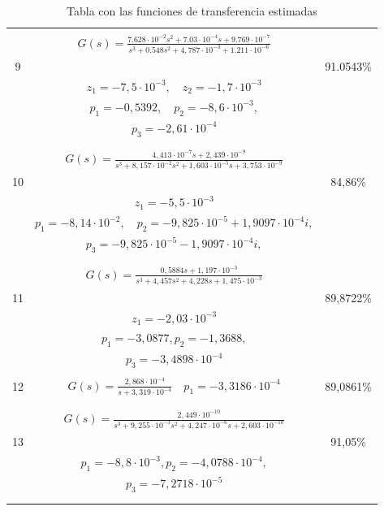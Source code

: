 \begin{longtable}{| c | c | c |}
\hline
     &  &   \\
     &  \large$ G(s) = \frac{7.628 \cdot 10^{-2}s^{2}+ 7.03 \cdot 10^{-4}s + 9.769 \cdot 10^{-7}}{ s^{3} + 0.548s^{2} + 4,787\cdot 10^{-3} + 1.211 \cdot 10^{-6}} $  \\
  9 &  & 91.0543\%  \\
     &  $ z_{1} = -7,5 \cdot 10^{-3},\quad z_{2} = -1,7 \cdot 10^{-3} $ &   \\
     &  $ p_{1} = -0,5392,\quad p_{2} = -8,6 \cdot 10^{-3}, $ & \\
     &  $ p_{3}= -2,61 \cdot 10^{-4} $ &  \\
     &  &   \\
\hline
     &  &   \\
     &  \large$ G(s) = \frac{4,413 \cdot 10^{-7}s + 2,439 \cdot 10^{-9}}{ s^{3} + 8,157 \cdot 10^{-2}s^{2} + 1,603\cdot 10^{-5}s + 3,753 \cdot 10^{-9}} $ &  \\
10 &  & 84,86\%  \\
     &  $ z_{1} = -5,5 \cdot 10^{-3}$ &   \\
     &  $ p_{1} = -8,14 \cdot 10^{-2},\quad p_{2} =-9,825 \cdot 10 ^{-5} + 1,9097 \cdot 10^{-4}i,$ &  \\
     &  $ p_{3} = -9,825 \cdot 10 ^{-5} - 1,9097 \cdot 10^{-4}i, $  &   \\
     &  &  \\
\hline
     &  &   \\
     &  \large$ G(s) = \frac{0,5884s + 1,197 \cdot 10^{-3}}{ s^{3} + 4,457s^{2} + 4,228 s + 1,475 \cdot 10^{-3}} $ &  \\
11 &  & 89,8722\% \\
     &  $ z_{1} = -2,03 \cdot 10^{-3}$ &   \\
     &  $ p_{1} =-3,0877,   p_{2} = -1,3688, $ & \\
     &  $ p_{3} = -3,4898 \cdot 10^{-4} $ &  \\
\hline
     &  &   \\
 12 &  \large$ G(s) = \frac{2,868 \cdot 10^{-4}}{ s + 3,319 \cdot 10^{-4}} \quad p_{1} = -3,3186 \cdot 10^{-4} $ &  89,0861\%\\
     &  &  \\
\hline 
     &  &   \\
     &  \large$ G(s) = \frac{2,449 \cdot 10^{-10}}{ s^{3} + 9,255 \cdot 10^{-3}s^{2} + 4,247 \cdot 10^{-6} s + 2,603 \cdot 10^{-10}} $ & \\
13 &  & 91,05\%  \\
     &  $  p_{1} =-8,8 \cdot 10^{-3},  p_{2} = -4,0788 \cdot 10^{-4}, $ & \\
     &  $  p_{3} = -7,2718 \cdot 10^{-5} $ &  \\
\hline \\
\caption{Tabla con las funciones de transferencia estimadas}\label{tablaA1.1}
\end{longtable}

